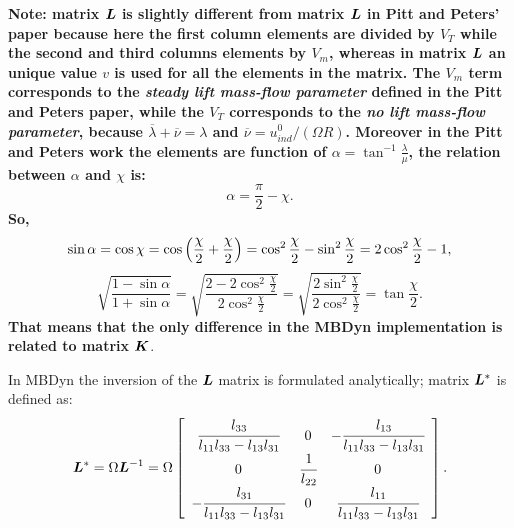 \textbf{Note: matrix $\bm{L}$ is slightly different from matrix $\bm{L}$
in Pitt and Peters' paper \cite{PITT} because here the
first column elements are divided by $V_T$ while the second and
third columns elements by $V_m$, whereas in matrix $\bm{L}$
an unique value $v$ is used for all the elements in the matrix.
The $V_m$ term corresponds to the \emph{steady lift mass-flow parameter}
defined in the Pitt and Peters paper, while the $V_T$ corresponds to
the \emph{no lift mass-flow parameter}, because 
$\overline{\lambda} + \overline{\nu} = \lambda$ and 
$\overline{\nu} = u_{ind}^{0}/(\Omega R)$.
Moreover in the Pitt and Peters work the elements are function of
$\alpha = \tan^{-1}{\frac{\lambda}{\mu}}$, the relation between $\alpha$ and
$\chi$ is:
\begin{equation}
\alpha = \frac{\pi}{2} - \chi.
\end{equation}
So,
\begin{equation}
\sin{\alpha} = 
\cos{\chi} = 
\cos{ \left( \frac{\chi}{2}+\frac{\chi}{2} \right) }=
\cos^{2}{\frac{\chi}{2}} - \sin^{2}{\frac{\chi}{2}} = 
2 \cos^{2} {\frac{\chi}{2}}-1,
\end{equation}
\begin{equation}
\sqrt{\frac{1-\sin{\alpha}}{1+\sin{\alpha}}} = 
\sqrt{ \frac{2 - 2 \cos^{2}{\frac{\chi}{2}}}{2 \cos^{2}{\frac{\chi}{2}}} } = 
\sqrt{ \frac{ 2 \sin^{2}{\frac{\chi}{2}}}{2 \cos^{2}{\frac{\chi}{2}}} } = 
\tan{\frac{\chi}{2}}.
\end{equation}
That means that the only difference in the MBDyn implementation is
related to matrix $\bm{K}$}.

In MBDyn the inversion of the $\bm{L}$ matrix is formulated analytically;
matrix $\bm{L}^*$ is defined as:
\begin{equation}
\bm{L}^* = \Omega \bm{L}^{-1} = \Omega \left[
\begin{array}{ccc}
\cfrac{l_{33}}{l_{11}l_{33}-l_{13}l_{31}} & 0 & -\cfrac{l_{13}}{l_{11}l_{33}-l_{13}l_{31}} \\
0 & \cfrac{1}{l_{22}} & 0 \\
-\cfrac{l_{31}}{l_{11}l_{33}-l_{13}l_{31}} & 0 & \cfrac{l_{11}}{l_{11}l_{33}-l_{13}l_{31}}
\end{array}
\right].
\end{equation}

